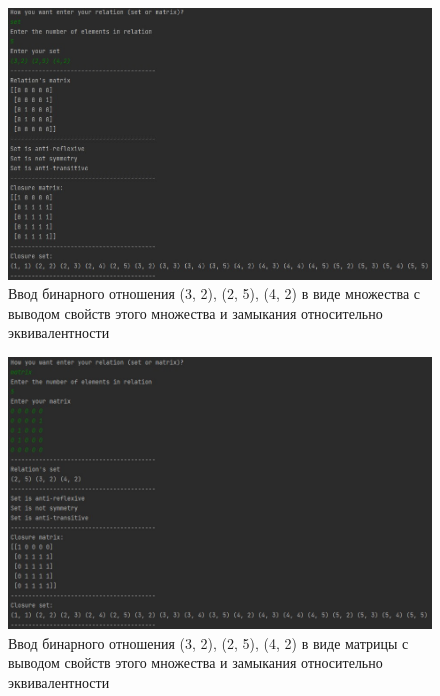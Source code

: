\documentclass[spec, och, labwork]{shiza}
\begin{document}
        \begin{figure}[H]
            \centering      %
            \includegraphics[width=1.\textwidth]{2}
            \caption{Ввод бинарного отношения {(3, 2), (2, 5), (4, 2)} в виде множества с выводом свойств этого множества и замыкания относительно эквивалентности}
            \label{fig:image1}
        \end{figure}

        \begin{figure}[H]
            \centering      %
            \includegraphics[width=1.\textwidth]{3}
            \caption{Ввод бинарного отношения {(3, 2), (2, 5), (4, 2)} в виде матрицы с выводом свойств этого множества и замыкания относительно эквивалентности}
            \label{fig:image1}
        \end{figure}
\end{document}
